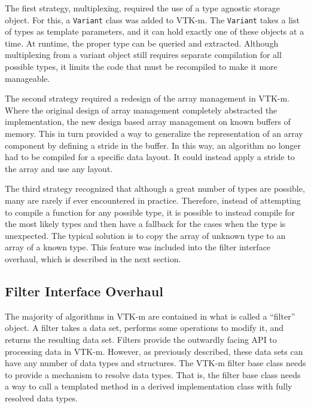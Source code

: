The first strategy, multiplexing, required the use of a type agnostic storage object.
For this, a \texttt{Variant} class was added to VTK-m.
The \texttt{Variant} takes a list of types as template parameters, and it can hold exactly one of these objects at a time.
At runtime, the proper type can be queried and extracted.
Although multiplexing from a variant object still requires separate compilation for all possible types, it limits the code that must be recompiled to make it more manageable.

The second strategy required a redesign of the array management in VTK-m.
Where the original design of array management completely abstracted the implementation, the new design based array management on known buffers of memory.
This in turn provided a way to generalize the representation of an array component by defining a stride in the buffer.
In this way, an algorithm no longer had to be compiled for a specific data layout.
It could instead apply a stride to the array and use any layout.

The third strategy recognized that although a great number of types are possible, many are rarely if ever encountered in practice.
Therefore, instead of attempting to compile a function for any possible type, it is possible to instead compile for the most likely types and then have a fallback for the cases when the type is unexpected.
The typical solution is to copy the array of unknown type to an array of a known type.
This feature was included into the filter interface overhaul, which is described in the next section.

\subsection{Filter Interface Overhaul}


The majority of algorithms in VTK-m are contained in what is called a ``filter'' object.
A filter takes a data set, performs some operations to modify it, and returns the resulting data set.
Filters provide the outwardly facing API to processing data in VTK-m.
However, as previously described, these data sets can have any number of data types and structures.
The VTK-m filter base class needs to provide a mechanism to resolve data types.
That is, the filter base class needs a way to call a templated method in a derived implementation class with fully resolved data types.

